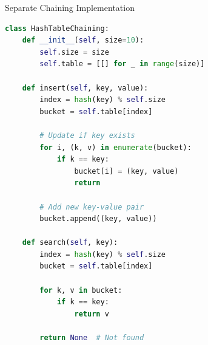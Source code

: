 \documentclass[aspectratio=169]{beamer}
\begin{document}
\begin{frame}[fragile]{Separate Chaining Implementation}
  \begin{lstlisting}[language=Python, basicstyle=\ttfamily\footnotesize]
class HashTableChaining:
    def __init__(self, size=10):
        self.size = size
        self.table = [[] for _ in range(size)]

    def insert(self, key, value):
        index = hash(key) % self.size
        bucket = self.table[index]

        # Update if key exists
        for i, (k, v) in enumerate(bucket):
            if k == key:
                bucket[i] = (key, value)
                return

        # Add new key-value pair
        bucket.append((key, value))

    def search(self, key):
        index = hash(key) % self.size
        bucket = self.table[index]

        for k, v in bucket:
            if k == key:
                return v

        return None  # Not found
  \end{lstlisting}
\end{frame}
\end{document}
